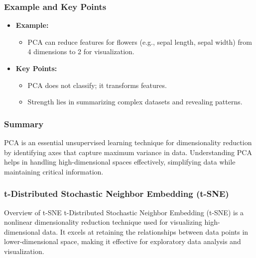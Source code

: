 \documentclass[aspectratio=169]{beamer}
\begin{document}
\begin{frame}[fragile]
    \frametitle{Example and Key Points}
    \begin{itemize}
        \item \textbf{Example:} 
        \begin{itemize}
            \item PCA can reduce features for flowers (e.g., sepal length, sepal width) from 4 dimensions to 2 for visualization.
        \end{itemize}
        
        \item \textbf{Key Points:} 
        \begin{itemize}
            \item PCA does not classify; it transforms features.
            \item Strength lies in summarizing complex datasets and revealing patterns.
        \end{itemize}
    \end{itemize}
\end{frame}

\begin{frame}[fragile]
    \frametitle{Summary}
    \begin{block}{}
        PCA is an essential unsupervised learning technique for dimensionality reduction by identifying axes that capture maximum variance in data. 
        Understanding PCA helps in handling high-dimensional spaces effectively, simplifying data while maintaining critical information.
    \end{block}
\end{frame}

\begin{frame}[fragile]
    \frametitle{t-Distributed Stochastic Neighbor Embedding (t-SNE)}
    \begin{block}{Overview of t-SNE}
        t-Distributed Stochastic Neighbor Embedding (t-SNE) is a nonlinear dimensionality reduction technique used for visualizing high-dimensional data. It excels at retaining the relationships between data points in lower-dimensional space, making it effective for exploratory data analysis and visualization.
    \end{block}
\end{frame}
\end{document}
